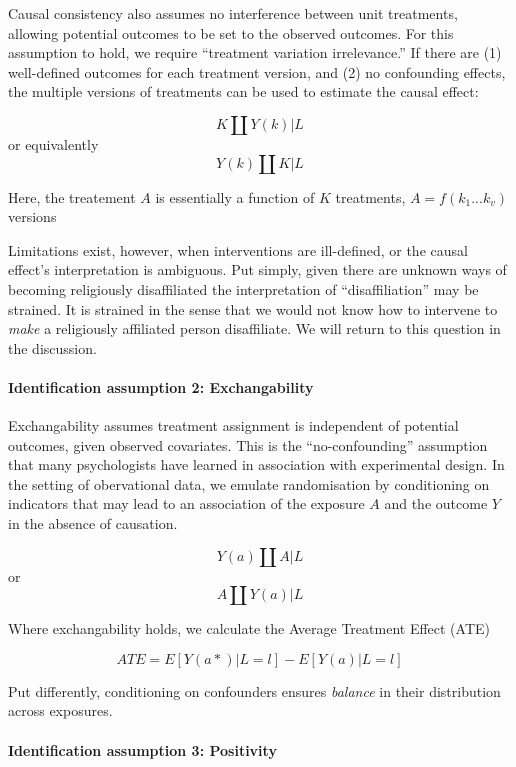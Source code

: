 \documentclass[
  letterpaper,
  DIV=11,
  numbers=noendperiod]{scrartcl}
\let\oldparagraph\paragraph
\renewcommand{\paragraph}[1]{\oldparagraph{#1}\mbox{}}
\begin{document}
Causal consistency also assumes no interference between unit treatments,
allowing potential outcomes to be set to the observed outcomes. For this
assumption to hold, we require ``treatment variation irrelevance.'' If
there are (1) well-defined outcomes for each treatment version, and (2)
no confounding effects, the multiple versions of treatments can be used
to estimate the causal effect:

\[K \coprod Y(k) | L\] or equivalently \[Y(k) \coprod K | L\]

Here, the treatement \(A\) is essentially a function of \(K\)
treatments, \(A = f(k_1...k_v)\) versions

Limitations exist, however, when interventions are ill-defined, or the
causal effect's interpretation is ambiguous. Put simply, given there are
unknown ways of becoming religiously disaffiliated the interpretation of
``disaffiliation'' may be strained. It is strained in the sense that we
would not know how to intervene to \emph{make} a religiously affiliated
person disaffiliate. We will return to this question in the discussion.

\hypertarget{identification-assumption-2-exchangability}{%
\paragraph{Identification assumption 2:
Exchangability}\label{identification-assumption-2-exchangability}}

Exchangability assumes treatment assignment is independent of potential
outcomes, given observed covariates. This is the ``no-confounding''
assumption that many psychologists have learned in association with
experimental design. In the setting of obervational data, we emulate
randomisation by conditioning on indicators that may lead to an
association of the exposure \(A\) and the outcome \(Y\) in the absence
of causation.

\[Y(a)\coprod  A|L\] or \[A \coprod  Y(a)|L\]

Where exchangability holds, we calculate the Average Treatment Effect
(ATE)

\[
ATE = E[Y(a*)|L = l] - E[Y(a)|L = l] 
\]

Put differently, conditioning on confounders ensures \emph{balance} in
their distribution across exposures.

\hypertarget{identification-assumption-3-positivity}{%
\paragraph{Identification assumption 3:
Positivity}\label{identification-assumption-3-positivity}}
\end{document}
